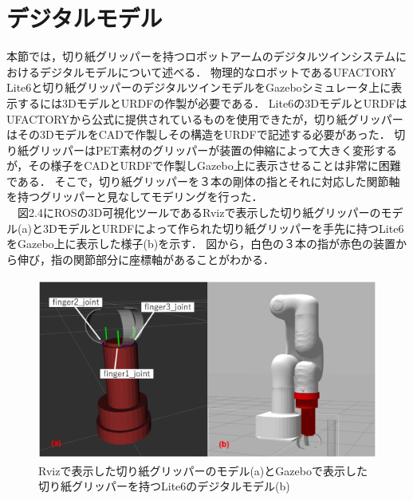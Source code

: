 \section{デジタルモデル}
本節では，切り紙グリッパーを持つロボットアームのデジタルツインシステムにおけるデジタルモデルについて述べる．
物理的なロボットであるUFACTORY Lite6と切り紙グリッパーのデジタルツインモデルをGazeboシミュレータ上に表示するには3DモデルとURDFの作製が必要である．
Lite6の3DモデルとURDFはUFACTORYから公式に提供されているものを使用できたが，切り紙グリッパーはその3DモデルをCADで作製しその構造をURDFで記述する必要があった．
切り紙グリッパーはPET素材のグリッパーが装置の伸縮によって大きく変形するが，その様子をCADとURDFで作製しGazebo上に表示させることは非常に困難である．
そこで，切り紙グリッパーを３本の剛体の指とそれに対応した関節軸を持つグリッパーと見なしてモデリングを行った．\\
　図2.4にROSの3D可視化ツールであるRvizで表示した切り紙グリッパーのモデル(a)と3DモデルとURDFによって作られた切り紙グリッパーを手先に持つLite6をGazebo上に表示した様子(b)を示す．
図から，白色の３本の指が赤色の装置から伸び，指の関節部分に座標軸があることがわかる．

\begin{figure}[htbt]
	\centering
	 \includegraphics[height=60mm]{kirigami_gripper_rviz_and_lite6_with_kirigami_gripper_gazebo.eps}
	 \caption{Rvizで表示した切り紙グリッパーのモデル(a)とGazeboで表示した切り紙グリッパーを持つLite6のデジタルモデル(b)}
	 \label{fig:f2}
\end{figure}

